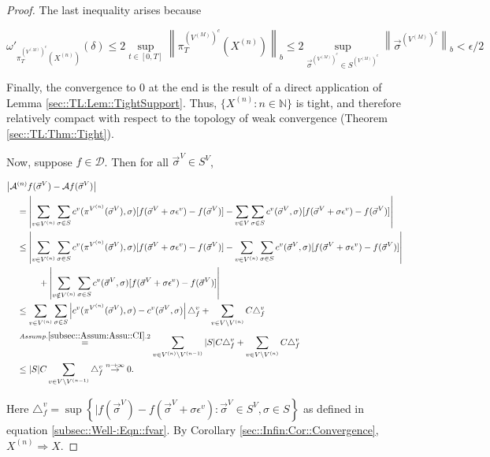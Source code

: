 \documentclass[12pt]{article}
\newcommand{\mb}{\mathbb}
\newcommand{\mc}{\mathcal}
\newcommand{\ra}{\rightarrow}
\newcommand{\os}{\overset}
\newcommand{\ep}{\epsilon}
\newcommand{\ind}{\hspace{24pt}}
\renewcommand{\v}{v}							%
\renewcommand{\S}{S}							%
\newcommand{\s}{\sigma}							%
\newcommand{\sv}{\vec{\s}}						%
\renewcommand{\b}{b}							%
\newcommand{\ev}{\ep}							%
\newcommand{\T}{T}								%
\renewcommand{\t}{t}							%
\newcommand{\proj}{\pi}							%
\newcommand{\X}{X}								%
\newcommand{\IG}{\mc{A}}						%
\newcommand{\IGr}{c}							%
\newcommand{\f}{f}								%
\newcommand{\vind}[1]{^{#1}}					%
\newcommand{\carp}[1]{^{#1}}					%
\newcommand{\vsi}[1]{^{#1}}						%
\newcommand{\ts}[1]{_{#1}}						%
\newcommand{\const}{C}							%
\newcommand{\sln}[1]{^{(#1)}}					%
\newcommand{\core}{\mc{D}}						%
\newcommand{\delt}{\triangle}					%
\newcommand{\cconst}{M}							%
\newcommand{\cmodu}{\omega'}					%
\newcommand{\deltf}[1]{_{#1}}					%
\newcommand{\pra}[1]{_{#1}}						%
\begin{document}
\begin{proof}
The last inequality arises because

\[\cmodu\pra{\proj\vsi{\left(V\sln{\cconst}\right)^c}\ts{\T}(\X\sln{n})}(\delta) \leq 2 \sup_{\t\in [0,\T]} \left\|\proj\vsi{\left(V\sln{\cconst}\right)^c}\ts{\T}(\X\sln{n})\right\|_{\b} \leq 2 \sup_{\sv\vsi{\left(V\sln{\cconst}\right)^c} \in \S\carp{\left(V\sln{\cconst}\right)^c}} \left\|\sv\vsi{\left(V\sln{\cconst}\right)^c}\right\|_{\b} < \ep/2\]

Finally, the convergence to 0 at the end is the result of a direct application of Lemma \ref{sec::TL:Lem::TightSupport}. Thus, \(\{\X\sln{n}:n\in \mb{N}\}\) is tight, and therefore relatively compact with respect to the topology of weak convergence (Theorem \ref{sec::TL:Thm::Tight}).

Now, suppose \(f\in \core\). Then for all \(\sv\vsi{V} \in \S\carp{V}\),

\begin{align*}
\big|\IG&\sln{n}f(\sv\vsi{V}) - \IG f(\sv\vsi{V})\big|\\
&= \left|\sum_{\v \in V\sln{n}} \sum_{\s \in \S} \IGr\vind{\v}(\proj\vsi{V\sln{n}}(\sv\vsi{V}),\s)[f(\sv\vsi{V}+\s\ev\vind{\v}) - f(\sv\vsi{V})] - \sum_{\v \in V}\sum_{\s \in \S} \IGr\vind{\v}(\sv\vsi{V},\s)[f(\sv\vsi{V}+\s\ev\vind{\v}) - f(\sv\vsi{V})]\right|\\
&\leq  \left|\sum_{\v \in V\sln{n}} \sum_{\s \in \S} \IGr\vind{\v}(\proj\vsi{V\sln{n}}(\sv\vsi{V}),\s)[f(\sv\vsi{V}+\s\ev\vind{\v}) - f(\sv\vsi{V})] - \sum_{\v \in V\sln{n}}\sum_{\s \in \S} \IGr\vind{\v}(\sv\vsi{V},\s)[f(\sv\vsi{V}+\s\ev\vind{\v}) - f(\sv\vsi{V})]\right|\\
&\ind  +\left|\sum_{\v \notin V\sln{n}} \sum_{\s\in \S} \IGr\vind{\v}(\sv\vsi{V},\s)[f(\sv\vsi{V}+\s\ev\vind{\v}) - f(\sv\vsi{V})]\right|\\
&\leq \sum_{\v \in V\sln{n}}\sum_{\s \in \S} \left|\IGr\vind{\v}(\proj\vsi{V\sln{n}}(\sv\vsi{V}),\s) - \IGr\vind{\v}(\sv\vsi{V},\s)\right|\delt\deltf{\f}\vind{\v} + \sum_{\v \in V\setminus V\sln{n}} \const\delt\deltf{\f}\vind{\v}\\
&\os{Assump. \ref{subsec::Assum:Assu::CI}.2}{=} \sum_{\v \in V\sln{n}\setminus V\sln{n-1}} |\S|\const \delt\deltf{\f}\vind{\v} + \sum_{\v \in V\setminus V\sln{n}} \const\delt\deltf{\f}\vind{\v}\\
&\leq |\S|C\sum_{\v \in V\setminus V\sln{n-1}} \delt\deltf{\f}\vind{\v} \os{n\ra\infty}{\ra} 0.
\end{align*}

Here \(\delt\deltf{\f}\vind{\v} = \sup\left\{|f(\sv\vsi{V}) - f(\sv\vsi{V} + \s\ev\vind{\v}): \sv\vsi{V}\in \S\carp{V},\s \in \S\right\}\) as defined in equation \eqref{subsec::Well-:Eqn::fvar}. By Corollary \ref{sec::Infin:Cor::Convergence}, \(\X\sln{n}\Rightarrow \X\).
\end{proof}
\end{document}
